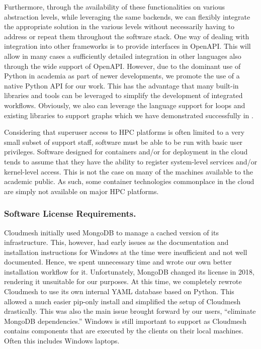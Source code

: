\documentclass[utf8]{FrontiersinVancouver} %
\begin{document}
Furthermore, through the availability of these functionalities on various abstraction levels, while leveraging the same backends, we can flexibly integrate the appropriate solution in the various levels without necessarily having to address or repeat them throughout the software stack. One way of dealing with integration into other frameworks is to provide interfaces in OpenAPI. This will allow in many cases a sufficiently detailed integration in other languages also through the wide support of OpenAPI. However, due to the dominant use of Python in academia as part of newer developments, we promote the use of a native Python API for our work. This has the advantage that many built-in libraries and tools can be leveraged to simplify the development of integrated workflows. Obviously, we also can leverage the language support for loops and existing libraries to support graphs which we have demonstrated successfully in \citep{cloudmesh-cc}.

Considering that superuser access to HPC platforms is often limited to a very small subset of support staff, software must be able to be run with basic user privileges. Software designed for containers and/or for deployment in the cloud tends to assume that they have the ability to register system-level services and/or kernel-level access. This is not the case on many of the machines available to the academic public. As such, some container technologies commonplace in the cloud are simply not available on major HPC platforms.

\subsubsection{Software License Requirements.} 

Cloudmesh initially used MongoDB to manage a cached version of its infrastructure. This, however, had early issues as the documentation and installation instructions for Windows at the time were insufficient and not well documented. Hence, we spent unnecessary time and wrote our own better installation workflow for it. Unfortunately, MongoDB changed its license in 2018, rendering it unsuitable for our purposes.  At this time, we completely rewrote Cloudmesh to use its own internal YAML database based on Python. This allowed 
a much easier pip-only install and simplified the setup of Cloudmesh drastically. This was also the main issue brought forward by our users, ``eliminate MongoDB dependencies.'' Windows is still important to support as Cloudmesh contains components that are executed by the clients on their local machines. Often this includes Windows laptops.
\end{document}
